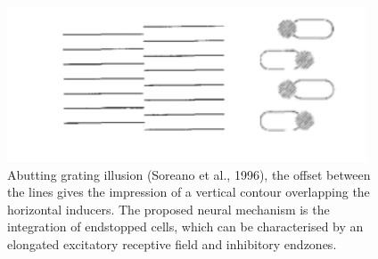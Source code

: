 \documentclass[12pt]{article}
\begin{document}
\begin{figure}
    \centering
    \includegraphics[width=0.95\textwidth]{figures/simple_abutting.png}
    \caption{Abutting grating illusion (Soreano et al., 1996), the offset between the lines gives the impression of a vertical contour overlapping the horizontal inducers. 
    The proposed neural mechanism is the integration of endstopped cells, which can be characterised by an elongated excitatory receptive field and inhibitory endzones.}
    \label{fig:figure_1}
\end{figure}
\end{document}
